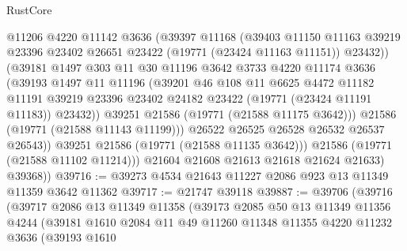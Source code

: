 \begin{lexlean}{RustCore}
\begin{coremodule}
                    @11206
                    @4220
                    @11142
                    @3636
                    (@39397
                      @11168
                      (@39403
                        @11150
                        @11163
                        @39219
                        @23396
                        @23402
                        @26651
                        @23422
                        (@19771 (@23424 @11163 @11151))
                        @23432))
                    (@39181
                      @1497
                      @303
                      @11
                      @30
                      @11196
                      @3642
                      @3733
                      @4220
                      @11174
                      @3636
                      (@39193
                        @1497
                        @11
                        @11196
                        (@39201
                          @46
                          @108
                          @11
                          @6625
                          @4472
                          @11182
                          @11191
                          @39219
                          @23396
                          @23402
                          @24182
                          @23422
                          (@19771 (@23424 @11191 @11183))
                          @23432))
                      @39251
                      @21586
                      (@19771 (@21588 @11175 @3642)))
                    @21586
                    (@19771 (@21588 @11143 @11199)))
                  @26522
                  @26525
                  @26528
                  @26532
                  @26537
                  @26543))
              @39251
              @21586
              (@19771 (@21588 @11135 @3642)))
            @21586
            (@19771 (@21588 @11102 @11214)))
          @21604
          @21608
          @21613
          @21618
          @21624
          @21633)
        @39368))
@39716 := @39273 @4534 @21643 @11227 @2086 @923 @13 @11349 @11359 @3642 @11362
@39717 := @21747 @39118
@39887 := @39706
    (@39716
      (@39717
        @2086
        @13
        @11349
        @11358
        (@39173
          @2085
          @50
          @13
          @11349
          @11356
          @4244
          (@39181
            @1610
            @2084
            @11
            @49
            @11260
            @11348
            @11355
            @4220
            @11232
            @3636
            (@39193
              @1610

\end{coremodule}
\end{lexlean}
